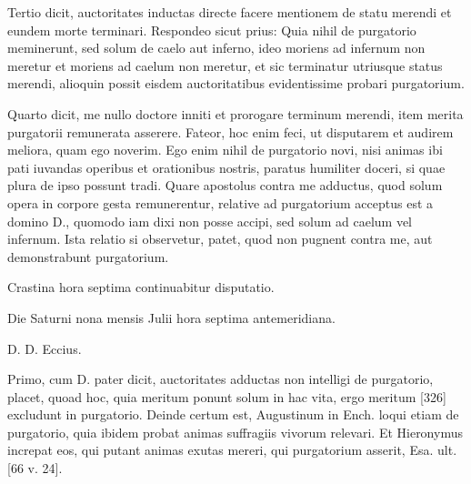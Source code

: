 Tertio dicit, auctoritates inductas directe facere mentionem de statu merendi et eundem morte terminari. Respondeo sicut prius: Quia nihil de purgatorio meminerunt, sed solum de caelo aut inferno, ideo moriens ad infernum non meretur et moriens ad caelum non meretur, et sic terminatur utriusque status merendi, alioquin possit eisdem auctoritatibus evidentissime probari purgatorium.

Quarto dicit, me nullo doctore inniti et prorogare terminum merendi, item merita purgatorii remunerata asserere. Fateor, hoc enim feci, ut disputarem et audirem meliora, quam ego noverim. Ego enim nihil de purgatorio novi, nisi animas ibi pati iuvandas operibus et orationibus nostris, paratus humiliter doceri, si quae plura de ipso possunt tradi. Quare apostolus contra me adductus, quod solum opera in corpore gesta remunerentur, relative ad purgatorium acceptus est a domino D., quomodo iam dixi non posse accipi, sed solum ad caelum vel infernum. Ista relatio si observetur, patet, quod non pugnent contra me, aut demonstrabunt purgatorium.

Crastina hora septima continuabitur disputatio.

Die Saturni nona mensis Julii hora septima antemeridiana.

D. D. Eccius.

Primo, cum D. pater dicit, auctoritates adductas non intelligi de purgatorio, placet, quoad hoc, quia meritum ponunt solum in hac vita, ergo meritum [326] excludunt in purgatorio. Deinde certum est, Augustinum in Ench. loqui etiam de purgatorio, quia ibidem probat animas suffragiis vivorum relevari. Et Hieronymus increpat eos, qui putant animas exutas mereri, qui purgatorium asserit, Esa. ult. [66 v. 24].

